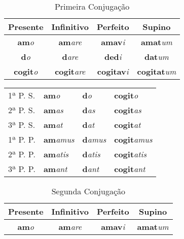 \documentclass{book}
\newcommand{\radicaldesinencia}[2]{\textbf{#1}\textit{#2}}
\begin{document}
\begin{table}
\centering
\caption{Primeira Conjugação}
\vspace{0.2cm}
\begin{tabular}{c|c|c|c}
\hline
Presente		&	Infinitivo		&	Perfeito		&	Supino	\\
\hline                                    		
\radicaldesinencia{am}{o}	&	\radicaldesinencia{am}{are}	&	\radicaldesinencia{amav}{i}	&	\radicaldesinencia{amat}{um}	\\
\radicaldesinencia{d}{o}	&	\radicaldesinencia{d}{are}	&	\radicaldesinencia{ded}{i}	&	\radicaldesinencia{dat}{um}	\\
\radicaldesinencia{cogit}{o}	&	\radicaldesinencia{cogit}{are}	&	\radicaldesinencia{cogitav}{i}	&	\radicaldesinencia{cogitat}{um}	\\
 \hline
\end{tabular}
\end{table}

\begin{table}
\centering
\begin{tabular}{l|l|l|l}
\hline
1ª P. S.	&  \radicaldesinencia{am}{o}		& \radicaldesinencia{d}{o}		& \radicaldesinencia{cogit}{o} \\
2ª P. S.	&  \radicaldesinencia{am}{as} 	& \radicaldesinencia{d}{as}		& \radicaldesinencia{cogit}{as} \\
3ª P. S.	&  \radicaldesinencia{am}{at} 	& \radicaldesinencia{d}{at}		& \radicaldesinencia{cogit}{at} \\
\hline
\hline
1ª P. P.	&  \radicaldesinencia{am}{amus} 	& \radicaldesinencia{d}{amus}	& \radicaldesinencia{cogit}{amus} \\
2ª P. P. 	&  \radicaldesinencia{am}{atis} 	& \radicaldesinencia{d}{atis} 	& \radicaldesinencia{cogit}{atis} \\
3ª P. P.	&  \radicaldesinencia{am}{ant} 	& \radicaldesinencia{d}{ant}		& \radicaldesinencia{cogit}{ant} \\ 
\hline
\end{tabular}
\end{table}
\clearpage





\begin{table}
\centering
\caption{Segunda Conjugação}
\vspace{0.2cm}
\begin{tabular}{c|c|c|c}
\hline
Presente		&	Infinitivo		&	Perfeito		&	Supino	\\
\hline                                    		
\radicaldesinencia{am}{o}	&	\radicaldesinencia{am}{are}	&	\radicaldesinencia{amav}{i}	&	\radicaldesinencia{amat}{um}	\\
 \hline
\end{tabular}
\end{table}
\end{document}
